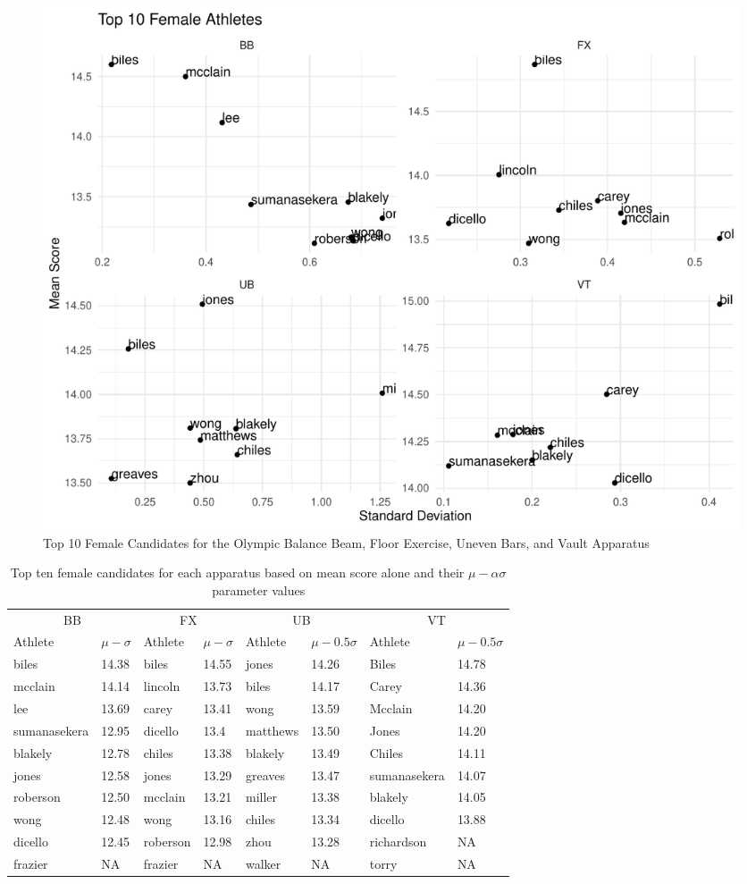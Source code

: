 \documentclass[12pt]{article}
\begin{document}
\begin{figure}
  \centering
  \includegraphics[scale=0.7]{FemaleAthleteApparatus.pdf}
  \caption{Top 10 Female Candidates for the Olympic Balance Beam, Floor Exercise, Uneven Bars, and Vault Apparatus}
  \label{fig:FA}
\end{figure}

\begin{table}
  \caption{Top ten female candidates for each apparatus based on mean score alone and 
  their $\mu - \alpha \sigma$ parameter values}
  \label{tab:tableBBP}
\centering
\begin{tabular}[t]{llllllll}
 \toprule
  \multicolumn{2}{c}{BB} & \multicolumn{2}{c}{FX} & \multicolumn{2}{c}{UB} & \multicolumn{2}{c}{VT}\\
  \cmidrule(lr){1-2}\cmidrule(lr){3-4}\cmidrule(lr){5-6}\cmidrule(lr){7-8}
Athlete & $\mu - \sigma$ & Athlete & $\mu - \sigma$ & Athlete & $\mu - 0.5 \sigma$ & Athlete & $\mu - 0.5 \sigma$\\
\midrule
biles & 14.38 & biles & 14.55 & jones & 14.26 & Biles & 14.78\\
\midrule
mcclain & 14.14 & lincoln & 13.73 & biles & 14.17 & Carey & 14.36\\
\midrule
lee & 13.69 & carey & 13.41 & wong & 13.59 & Mcclain & 14.20\\
\midrule
sumanasekera & 12.95 & dicello & 13.4 & matthews & 13.50 & Jones & 14.20\\
\midrule
blakely & 12.78 & chiles & 13.38 & blakely & 13.49 & Chiles & 14.11\\
\midrule
jones & 12.58 & jones & 13.29 & greaves & 13.47 & sumanasekera & 14.07\\
\midrule
roberson & 12.50 & mcclain & 13.21 & miller & 13.38 & blakely & 14.05\\
\midrule
wong & 12.48 & wong & 13.16 & chiles & 13.34 & dicello & 13.88\\
\midrule
dicello & 12.45 & roberson & 12.98 & zhou & 13.28 & richardson & NA\\
\midrule
frazier & NA & frazier & NA & walker & NA & torry & NA\\
\bottomrule
\end{tabular}
\end{table}
\end{document}
